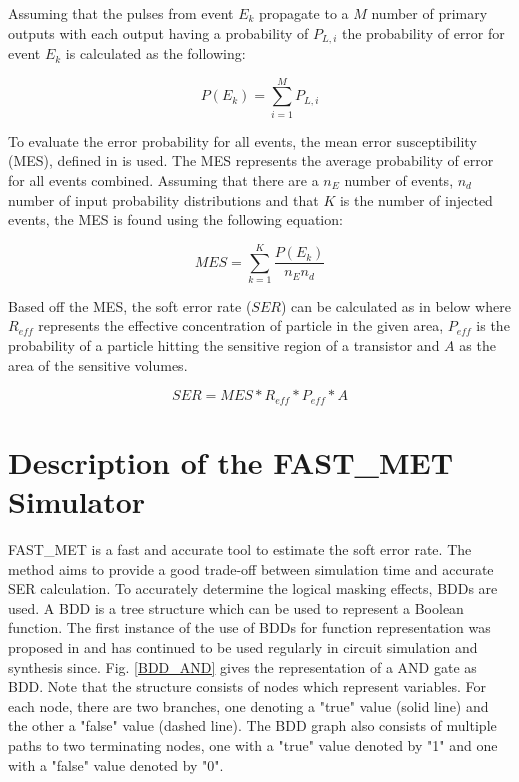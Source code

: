 Assuming that the pulses from event $E_k$ propagate to a $M$ number of primary outputs with each output having a probability of $P_{L,i}$ the probability of error for event $E_k$ is calculated as the following:  

\begin{equation} \label{event_eq}
P(E_k) = \sum_{i=1}^{M} P_{L,i}
\end{equation}

To evaluate the error probability for all events, the mean error susceptibility (MES), defined in \cite{METSys} is used. The MES represents the average probability of error for all events combined. Assuming that there are a $n_E$ number of events, $n_d$ number of input probability distributions and that $K$ is the number of injected events, the MES is found using the following equation:

\begin{equation} \label{MES}
MES = \sum_{k=1}^{K} \frac{P(E_k)}{n_E n_d}
\end{equation}

Based off the MES, the soft error rate ($SER$) can be calculated as in below where $R_{eff}$ represents the effective concentration of particle in the given area, $P_{eff}$ is the probability of a particle hitting the sensitive region of a transistor and $A$ as the area of the sensitive volumes.

\begin{equation} \label{SER}
SER = MES*R_{eff}*P_{eff}*A 
\end{equation}

\section{Description of the FAST\_MET Simulator} \label{ch3:desc}

FAST\_MET is a fast and accurate tool to estimate the soft error rate. The method aims to provide a good trade-off between simulation time and accurate SER calculation. To accurately determine the logical masking effects, BDDs are used. A BDD is a tree structure which can be used to represent a Boolean function. The first instance of the use of BDDs for function representation was proposed in \cite{Bryant1986} and has continued to be used regularly in circuit simulation and synthesis since. Fig. \ref{BDD_AND} gives the representation of a AND gate as BDD. Note that the structure consists of nodes which represent variables. For each node, there are two branches, one denoting a "true" value (solid line) and the other a "false" value (dashed line). The BDD graph also consists of multiple paths to two terminating nodes, one with a "true" value denoted by "1" and one with a "false" value denoted by "0".

